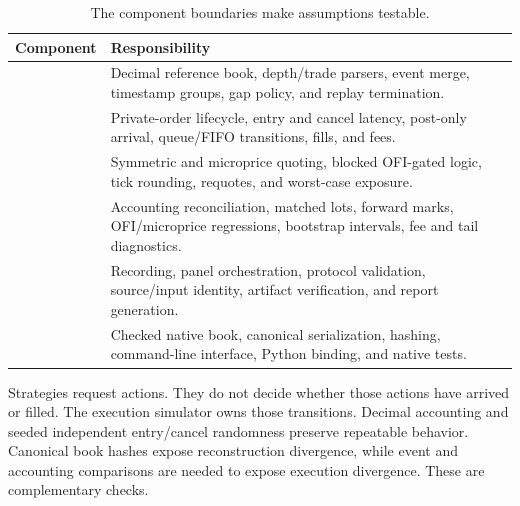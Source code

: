 \begin{table}[H]
\centering
\caption{The component boundaries make assumptions testable.}
\begin{tabularx}{\textwidth}{@{}L{0.29\textwidth}Y@{}}
\toprule
Component & Responsibility \\
\midrule
{} & Decimal reference book, depth/trade parsers, event merge, timestamp groups, gap policy, and replay termination. \\
 & Private-order lifecycle, entry and cancel latency, post-only arrival, queue/FIFO transitions, fills, and fees. \\
 & Symmetric and microprice quoting, blocked OFI-gated logic, tick rounding, requotes, and worst-case exposure. \\
 & Accounting reconciliation, matched lots, forward marks, OFI/microprice regressions, bootstrap intervals, fee and tail diagnostics. \\
 & Recording, panel orchestration, protocol validation, source/input identity, artifact verification, and report generation. \\
 & Checked native book, canonical serialization, hashing, command-line interface, Python binding, and native tests. \\
\bottomrule
\end{tabularx}
\end{table}

Strategies request actions. They do not decide whether those actions have
arrived or filled. The execution simulator owns those transitions. Decimal
accounting and seeded independent entry/cancel randomness preserve repeatable
behavior. Canonical book hashes expose reconstruction divergence, while event
and accounting comparisons are needed to expose execution divergence. These
are complementary checks.
